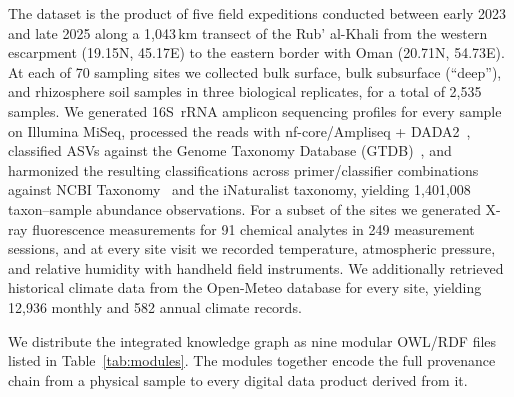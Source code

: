 \documentclass[11pt,a4paper]{article}
\begin{document}
The dataset is the product of five field expeditions conducted
between early 2023 and late 2025 along a 1{,}043\,km transect of the
Rub' al-Khali from the western escarpment (19.15\degree N,
45.17\degree E) to the eastern border with Oman (20.71\degree N,
54.73\degree E). At each of 70 sampling sites we collected bulk
surface, bulk subsurface (``deep''), and rhizosphere soil samples in
three biological replicates, for a total of 2{,}535 samples. We
generated 16S~rRNA amplicon sequencing profiles for every sample on
Illumina MiSeq, processed the reads with nf-core/Ampliseq +
DADA2~\cite{nfcore,ampliseq,dada2}, classified ASVs against the
Genome Taxonomy Database (GTDB)~\cite{gtdb}, and harmonized the
resulting classifications across primer/classifier combinations
against NCBI Taxonomy~\cite{ncbitaxon} and the iNaturalist taxonomy,
yielding 1{,}401{,}008 taxon--sample abundance observations. For a
subset of the sites we generated X-ray fluorescence measurements for
91 chemical analytes in 249 measurement sessions, and at every site
visit we recorded temperature, atmospheric pressure, and relative
humidity with handheld field instruments. We additionally retrieved
historical climate data from the Open-Meteo database for every site,
yielding 12{,}936 monthly and 582 annual climate records.

We distribute the integrated knowledge graph as nine modular OWL/RDF
files listed in Table~\ref{tab:modules}. The modules together encode
the full provenance chain from a physical sample to every digital
data product derived from it.
\end{document}
